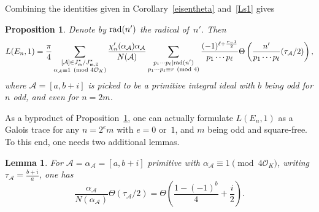 \documentclass[11pt, reqno]{amsart}
\theoremstyle{plain}
\newtheorem{lemma}[theorem]{Lemma}
\newtheorem{proposition}[theorem]{Proposition}
\theoremstyle{definition}
\numberwithin{equation}{section}
\begin{document}
Combining the identities given in Corollary~\ref{eisentheta} and~\eqref{Ls1} gives
\begin{proposition}\label{main1}
      Denote by ${\rm rad}(n')$ the radical of~$n'$. Then
    $$
    L(E_{n},1)=\frac{\pi}{4}\sum_{\substack{[\mathcal{A}]\in J_{\mathfrak{m}}^{*}/J_{\mathfrak{m},\mathbb{Z}}^{*}\\\alpha_{\mathcal{A}}\equiv1\pmod{4\mathcal{O}_{K}}}}\frac{\chi'_{n}(\alpha_{\mathcal{A}})\alpha_{\mathcal{A}}}{N(\mathcal{A})}\sum_{\substack{p_{1}\cdots p_{\ell}|{\rm rad}(n')\\ p_{1}\cdots p_{\ell}\equiv r\pmod{4}}}\frac{(-1)^{\ell+\frac{r-1}{2}}}{p_{1}\cdots p_{\ell}}\Theta\left(\frac{n'}{p_{1}\cdots p_{\ell}}(\tau_{\mathcal{A}}/2)\right),
    $$
    where $\mathcal{A}=[a,b+i]$ is picked to be a primitive integral ideal
    with $b$ being odd for $n$ odd, and even for $n=2m$.
    
 
\end{proposition}
  
As a byproduct of Proposition~\ref{main1}, one can actually formulate $L(E_{n},1)$ as a Galois trace for any $n=2^{e}m$ with $e=0$ or~$1$, and $m$ being odd and square-free. To this end, one needs two additional lemmas. 

\begin{lemma}\label{lemtheta}
     For $\mathcal{A}=\alpha_{\mathcal{A}}=[a,b+i]$ primitive with $\alpha_{\mathcal{A}}\equiv1\pmod{4\mathcal{O}_{K}}$, writing $\tau_{\mathcal{A}}=\frac{b+i}{a}$, one has
        $$
        \frac{\alpha_{\mathcal{A}}}{N(\alpha_{\mathcal{A}})}\Theta(\tau_{\mathcal{A}}/2)=\Theta\left(\frac{1-(-1)^{b}}{4}+\frac{i}{2}\right).
        $$

\end{lemma}
\end{document}
